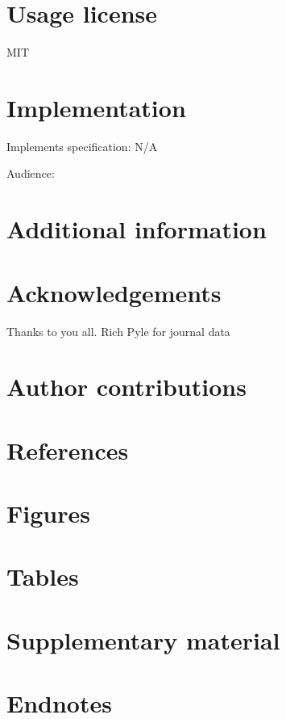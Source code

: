 \documentclass[
]{article}
\begin{document}
\hypertarget{usage-license}{%
\section{Usage license}\label{usage-license}}

MIT

\hypertarget{implementation}{%
\section{Implementation}\label{implementation}}

Implements specification: N/A

Audience:

\hypertarget{additional-information}{%
\section{Additional information}\label{additional-information}}

\hypertarget{acknowledgements}{%
\section{Acknowledgements}\label{acknowledgements}}

Thanks to you all. Rich Pyle for journal data

\hypertarget{author-contributions}{%
\section{Author contributions}\label{author-contributions}}

\hypertarget{references}{%
\section{References}\label{references}}

\hypertarget{figures}{%
\section{Figures}\label{figures}}

\hypertarget{tables}{%
\section{Tables}\label{tables}}

\hypertarget{supplementary-material}{%
\section{Supplementary material}\label{supplementary-material}}

\hypertarget{endnotes}{%
\section{Endnotes}\label{endnotes}}
\end{document}
